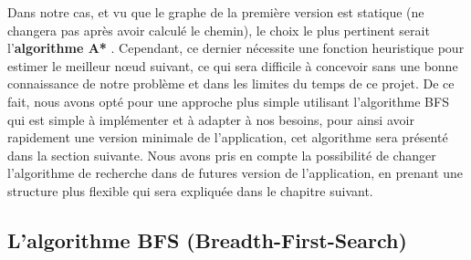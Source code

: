 Dans notre cas, et vu que le graphe de la première version est statique (ne changera pas après avoir calculé le chemin), le choix le plus pertinent serait l'\textbf{algorithme A*} \cite{Astar}.
Cependant, ce dernier nécessite une fonction heuristique pour estimer le meilleur nœud suivant, ce qui sera difficile à concevoir sans une bonne connaissance de notre problème et dans les limites du temps de ce projet.
De ce fait, nous avons opté pour une approche plus simple utilisant l'algorithme BFS qui est simple à implémenter et à adapter à nos besoins, pour ainsi avoir rapidement une version minimale de l'application, cet algorithme sera présenté dans la section suivante.\newline
Nous avons pris en compte la possibilité de changer l'algorithme de recherche dans de futures version de l'application, en prenant une structure plus flexible qui sera expliquée dans le chapitre suivant.

\subsection{L'algorithme BFS (Breadth-First-Search)}

